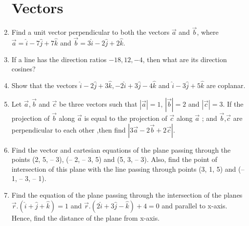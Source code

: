 \begin{enumerate}
\section{\textbf{Vectors}}
\item Find a unit vector perpendicular to both the vectors $\overrightarrow{a}$ and $\overrightarrow{b}$, where $\overrightarrow{a}= \hat{i} - 7\hat{j} + 7\hat{k}$ and $\overrightarrow{b} = 3\hat{i} - 2\hat{j} + 2\hat{k}$.
\item If a line has the direction ratios $-18, 12, -4$, then what are its direction cosines?
\item Show that the vectors $\hat{i} - 2\hat{j} + 3\hat{k}, - 2\hat{i} + 3\hat{j} - 4\hat{k} $ and $\hat{i} - 3\hat{j} + 5\hat{k}$ are coplanar.
\item Let $\overrightarrow{a},\overrightarrow{b}$ and $\overrightarrow{c}$ be three vectors such that $|\overrightarrow{a}| = 1$, $|\overrightarrow{b}| = 2$ and $|\overrightarrow{c}| = 3.$ If the projection of $\overrightarrow{b}$ along $\overrightarrow{a}$ is equal to the projection of $\overrightarrow{c}$ along $\overrightarrow{a}$ ; and $\overrightarrow{b}$,$\overrightarrow{c}$ are perpendicular to each other ,then find $|3\overrightarrow{a} - 2\overrightarrow{b} + 2\overrightarrow{c}|.$
\item Find the vector and cartesian equations of the plane passing through the points (2, 5, – 3), (– 2, – 3, 5) and (5, 3, – 3). Also, find the point of intersection of this plane with the line passing through points (3, 1, 5) and (– 1, – 3, – 1).
\item Find the equation of the plane passing through the intersection of the planes $\overrightarrow{r} . (\hat{i} +\hat{j} +\hat{k}) = 1$ and $\overrightarrow{r} . (2\hat{i} + 3\hat{j} - \hat{k}) + 4 = 0 $ and parallel to x-axis. Hence, find the distance of the plane from x-axis.
\end{enumerate}

